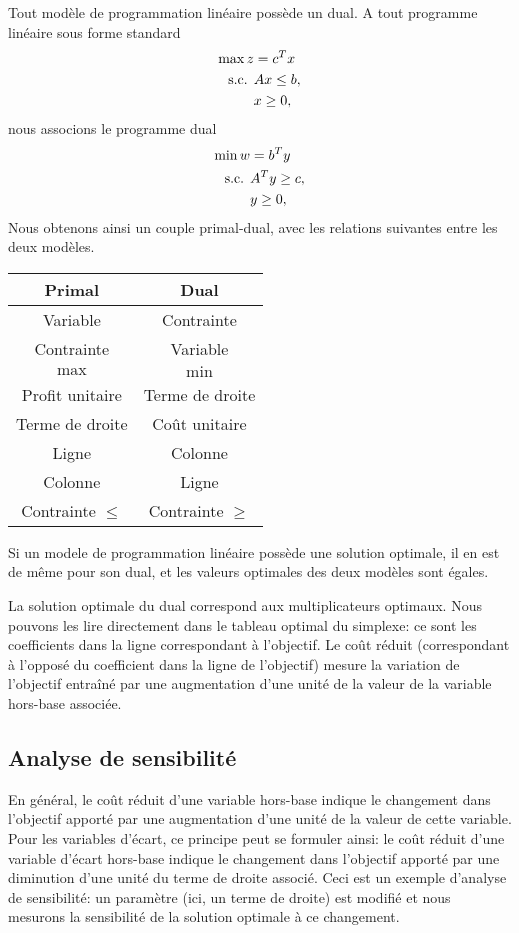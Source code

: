 Tout modèle de programmation linéaire possède un dual.
A tout programme linéaire sous forme standard
\begin{align*}
\max z &= c^Tx\\
\mbox{s.c. } & Ax \leq b, \\
& x \geq 0,
\end{align*}
nous associons le programme dual
\begin{align*}
\min w &= b^Ty\\
\mbox{s.c. } & A^Ty \geq c, \\
& y \geq 0,
\end{align*}
Nous obtenons ainsi un couple primal-dual, avec les relations suivantes entre les deux
modèles.
\begin{center}
\begin{tabular}{|c|c|}
\hline
{\bf Primal} & {\bf Dual} \\
\hline
Variable & Contrainte \\
\hline
Contrainte & Variable \\
\hline
$\max$ & $\min$ \\
\hline
Profit unitaire & Terme de droite \\
\hline
Terme de droite & Coût unitaire \\
\hline
Ligne & Colonne \\
\hline
Colonne & Ligne \\
\hline
Contrainte $\leq$ & Contrainte $\geq$ \\
\hline
\end{tabular}
\end{center}
Si un modele de programmation linéaire possède une solution optimale, il
en est de même pour son dual, et les valeurs optimales des deux modèles sont égales.

La solution optimale du dual correspond aux multiplicateurs optimaux.
Nous pouvons les lire directement dans le tableau optimal du simplexe: ce sont les coefficients dans la ligne correspondant à l'objectif.
Le coût réduit (correspondant à l'opposé du coefficient dans la ligne de l'objectif)
mesure la variation de l'objectif entraîné par une augmentation d'une unité de la valeur de la variable hors-base associée.

\subsection{Analyse de sensibilité}

En général, le coût réduit d'une variable hors-base indique le changement dans l'objectif apporté par une augmentation d'une unité de la valeur de cette variable.
Pour les variables d'écart, ce principe peut se formuler ainsi: le coût réduit d'une variable d'écart hors-base indique le changement dans l'objectif apporté par une diminution d'une unité du terme de droite associé.
Ceci est un exemple d'analyse de sensibilité: un paramètre (ici, un terme de droite) est modifié et nous mesurons la sensibilité de la solution optimale à ce changement.


